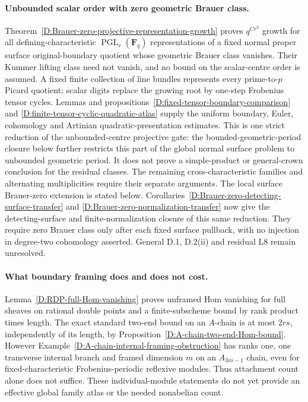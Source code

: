 \paragraph{Unbounded scalar order with zero geometric Brauer class.}
Theorem~\ref{D:Brauer-zero-projective-representation-growth} proves
$q^{Cr^2}$ growth for all defining-characteristic
$\operatorname{PGL}_r(\mathbf F_q)$ representations of a fixed normal
proper surface original-boundary quotient whose geometric Brauer class
vanishes. Their Kummer lifting class need not vanish, and no bound on
the scalar-centre order is assumed. A fixed finite collection of line
bundles represents every prime-to-$p$ Picard quotient; scalar digits
replace the growing root by one-step Frobenius tensor cycles.
Lemmas and propositions~\ref{D:fixed-tensor-boundary-comparison} and
\ref{D:finite-tensor-cyclic-quadratic-atlas} supply the uniform boundary,
Euler, cohomology and Artinian quadratic-presentation estimates.
This is one strict reduction of the unbounded-centre projective gate:
the bounded-geometric-period closure below further restricts this
part of the global normal surface problem to unbounded geometric period. It does not prove a
simple-product or general-crown conclusion for the residual classes.
The remaining cross-characteristic families and alternating
multiplicities require their separate arguments. The local surface
Brauer-zero extension is stated below.
Corollaries~\ref{D:Brauer-zero-detecting-surface-transfer} and
\ref{D:Brauer-zero-normalization-transfer} now give the detecting-surface
and finite-normalization closure of this same reduction. They require
zero Brauer class only after each fixed surface pullback, with no
injection in degree-two cohomology asserted. General D.1,
D.2(ii) and residual L8 remain unresolved.


\paragraph{What boundary framing does and does not cost.}
Lemma~\ref{D:RDP-full-Hom-vanishing} proves unframed Hom vanishing
for full sheaves on rational double points and a finite-subscheme
bound by rank product times length. The exact standard two-end
bound on an $A$-chain is at most $2rs$, independently of its length,
by Proposition~\ref{D:A-chain-two-end-Hom-bound}. However
Example~\ref{D:A-chain-internal-framing-obstruction} has ranks one,
one transverse internal branch and framed dimension $m$ on an
$A_{3m-1}$ chain, even for fixed-characteristic Frobenius-periodic
reflexive modules. Thus attachment count alone does not suffice.
These individual-module statements do not yet provide an effective
global family atlas or the needed nonabelian count.


